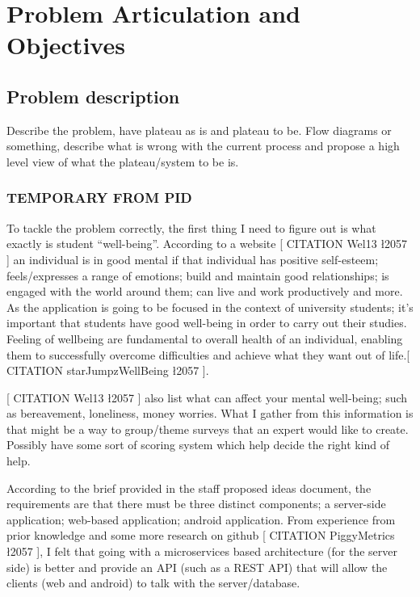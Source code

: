 \section{Problem Articulation and Objectives}

\subsection{Problem description}
Describe the problem, have plateau as is and plateau to be.
Flow diagrams or something, describe what is wrong with the current process and propose a high level view of what the
plateau/system to be is.

\subsubsection{\textbf{TEMPORARY FROM PID}}
To tackle the problem correctly, the first thing I need to figure out is what exactly is student “well-being”. According to a website [ CITATION Wel13 \l 2057 ]  an individual is in good mental if that individual has positive self-esteem; feels/expresses a range of emotions; build and maintain good relationships; is engaged with the world around them; can live and work productively and more. As the application is going to be focused in the context of university students; it’s important that students have good well-being in order to carry out their studies. Feeling of wellbeing are fundamental to overall health of an individual, enabling them to successfully overcome difficulties and achieve what they want out of life.[ CITATION starJumpzWellBeing \l 2057 ].

[ CITATION Wel13 \l 2057 ] also list what can affect your mental well-being; such as bereavement, loneliness, money worries. What I gather from this information is that might be a way to group/theme surveys that an expert would like to create. Possibly have some sort of scoring system which help decide the right kind of help.

According to the brief provided in the staff proposed ideas document, the requirements are that there must be three distinct components; a server-side application; web-based application; android application. From experience from prior knowledge and some more research on github [ CITATION PiggyMetrics \l 2057 ], I felt that going with a microservices based architecture (for the server side) is better and provide an API (such as a REST API) that will allow the clients (web and android) to talk with the server/database. 


